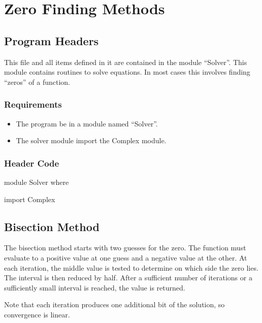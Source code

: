 \chapter{Zero Finding Methods}
\section{Program Headers}
This file and all items defined in it are contained in the module ``Solver''.  This module contains routines to solve equations.  In most cases this involves finding ``zeros'' of a function.

\subsection{Requirements}
\begin{itemize}
\item The program  be in a module named ``Solver''.
\item The solver module  import the Complex module.
\end{itemize}

\subsection{Header Code}
\begin{code}
module Solver where

import Complex
\end{code}

\section{Bisection Method}
The bisection method starts with two guesses for the zero.  The function must evaluate to a positive value at one guess and a negative value at the other.  At each iteration, the middle value is tested to determine on which side the zero lies.  The interval is then reduced by half.  After a sufficient number of iterations or a sufficiently small interval is reached, the value is returned.

Note that each iteration produces one additional bit of the solution, so convergence is linear.

